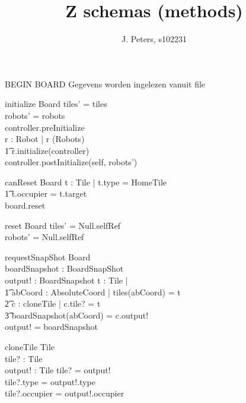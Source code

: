 \documentclass[a4paper,11pt]{article}
\begin{document}
\title{Z schemas (methods)}
\author{J. Peters, s102231}
\maketitle


BEGIN BOARD
Gegevens worden ingelezen vanuit file
\begin{schema}{initialize}
\Delta Board
\where
tiles' = tiles \\
robots' = robots \\
controller.preInitialize \\
\forall r : Robot | r \in \dom(Robots) \implies \\ \t1
r.initialize(controller) \\ 
controller.postInitialize(self, robots')
\end{schema}

\begin{schema}{canReset}
\Delta Board
\where
\IF \exists t : Tile | t.type = HomeTile \\ \t1
t.occupier = t.target \\
\THEN board.reset
\end{schema}

\begin{schema}{reset}
\Delta Board
\where
tiles' = Null.selfRef \\
robots' = Null.selfRef
\end{schema}

\begin{schema}{requestSnapShot}
\Xi Board \\
boardSnapshot : BoardSnapShot \\
output! : BoardSnapshot
\where
\forall t : Tile |  \\ \t1
\exists abCoord : AbsoluteCoord | tiles(abCoord) = t \implies \\ \t2
\exists c : cloneTile | c.tile? = t \\ \t3
boardSnapshot(abCoord) = c.output! \\
output! = boardSnapshot
\end{schema}

\begin{schema}{cloneTile}
\Delta Tile \\
tile? : Tile \\
output! : Tile 
\where
tile? \not = output! \\
tile?.type = output!.type \\
tile?.occupier = output!.occupier 
\end{schema}
\end{document}
